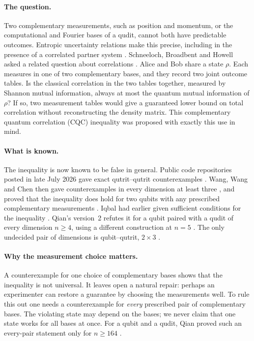 \documentclass[11pt,a4paper]{article}
\numberwithin{equation}{section}
\theoremstyle{remark}\newtheorem{remark}[theorem]{Remark}
\begin{document}
\paragraph{The question.}
Two complementary measurements, such as position and momentum, or the computational and Fourier bases of a qudit, cannot both have predictable outcomes. Entropic uncertainty relations make this precise, including in the presence of a correlated partner system \cite{berta,coles}. Schneeloch, Broadbent and Howell asked a related question about correlations \cite{schneeloch}. Alice and Bob share a state $\rho$. Each measures in one of two complementary bases, and they record two joint outcome tables. Is the classical correlation in the two tables together, measured by Shannon mutual information, always at most the quantum mutual information of $\rho$? If so, two measurement tables would give a guaranteed lower bound on total correlation without reconstructing the density matrix. This complementary quantum correlation (CQC) inequality was proposed with exactly this use in mind.

\paragraph{What is known.}
The inequality is now known to be false in general. Public code repositories posted in late July 2026 gave exact qutrit--qutrit counterexamples \cite{alper,oconnor}. Wang, Wang and Chen then gave counterexamples in every dimension at least three \cite{wangcounter}, and proved that the inequality does hold for two qubits with any prescribed complementary measurements \cite{wangqubits}. Iqbal had earlier given sufficient conditions for the inequality \cite{iqbal}. Qian's version~2 refutes it for a qubit paired with a qudit of every dimension $n\ge4$, using a different construction at $n=5$ \cite[Theorems~5.1, 7.7]{qian}. The only undecided pair of dimensions is qubit--qutrit, $2\times3$ \cite[Section~11(1)]{qian}.

\paragraph{Why the measurement choice matters.}
A counterexample for one choice of complementary bases shows that the inequality is not universal. It leaves open a natural repair: perhaps an experimenter can restore a guarantee by choosing the measurements well. To rule this out one needs a counterexample for \emph{every} prescribed pair of complementary bases. The violating state may depend on the bases; we never claim that one state works for all bases at once. For a qubit and a qudit, Qian proved such an every-pair statement only for $n\ge164$ \cite[Theorem~4.1]{qian}.
\end{document}
